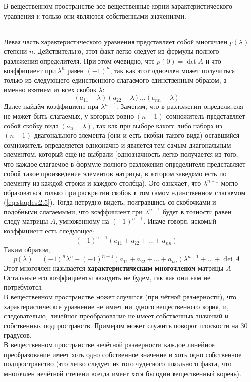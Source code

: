 \documentclass[11pt]{article}
\begin{document}
\begin{lemma}
    В вещественном пространстве все вещественные корни характеристического уравнения и только они являются собственными значениями.
\end{lemma} \leavevmode
\\
Левая часть характеристического уравнения представляет собой многочлен $p(\lambda)$ степени $n$. Действительно, этот факт легко следует из формулы полного разложения определителя. При этом очевидно, что $p(0) = \det A$ и что коэффициент при $\lambda^n$ равен $(-1)^n$, так как этот одночлен может получиться только из следующего единственного слагаемого единственным образом, а именно взятием из всех скобок $\lambda$:
\begin{equation*} \label{eq:staples:2.5} \tag{$\star$}
    (a_{11} - \lambda)(a_{22} - \lambda) \ldots (a_{nn} - \lambda)
\end{equation*}
Далее найдём коэффициент при $\lambda^{n - 1}$. Заметим, что в разложении определителя не может быть слагаемых, у которых ровно $(n - 1)$ сомножитель представляет собой скобку вида $(a_{ii} - \lambda)$, так как при выборе какого-либо набора из $(n - 1)$ диагонального элемента (они и есть скобки такого вида) оставшийся сомножитель определяется однозначно и является тем самым диагональным элементом, который ещё не выбрали (однозначность легко получается из того, что каждое слагаемое в формуле полного разложения определителя представляет собой такое произведение элементов матрицы, в котором заведомо есть по элементу из каждой строки и каждого столбца).
Это означает, что $\lambda^{n - 1}$ могло образоваться только при раскрытии скобок в том самом единственном слагаемом (\ref{eq:staples:2.5}). Тогда нетрудно видеть, поигравшись со скобочками и подобными слагаемыми, что коэффициент при $\lambda^{n - 1}$ будет в точности равен следу матрицы $A$, умноженному на $(-1)^{n - 1}$. Иначе говоря, искомый коэффициент есть следующее:
\[(-1)^{n - 1} (a_{11} + a_{22} + \ldots + a_{nn})\]
Таким образом,
\[p(\lambda) = (-1)^n \lambda^n + (-1)^{n - 1} (a_{11} + a_{22} + \ldots + a_{nn}) \lambda^{n - 1} + \ldots + \det A\]
Этот многочлен называется \textbf{характеристическим многочленом} матрицы $A$. Остальные его коэффициенты находить не будем, так как они нам не потребуются. 
\\
В вещественном пространстве может случится (при чётной размерности), что характеристическое уравнение не имеет ни одного вещественного корня, и, следовательно, линейное преобразование не имеет собственных значений и собственных подпространств. Примером может служить поворот плоскости на $30$ градусов.
\\
В вещественном пространстве нечётной размерности каждое линейное преобразование имеет хоть одно собственное значение и хоть одно собственное подпространство (это легко следует из того чудесного школьного факта, что многочлен нечётной степени всегда имеет хотя бы один вещественный корень).
\end{document}
